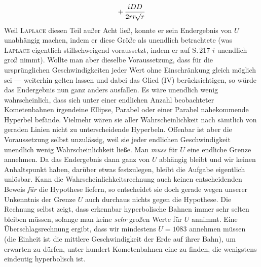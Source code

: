 \[+\,\frac{iDD}{2rr\mathord{{}^{}\!\surd}r}\]
Weil \textsc{Laplace} diesen Teil außer Acht ließ, konnte er sein Endergebnis von $U$ unabhängig machen, indem er diese Größe als unendlich betrachtete (was \textsc{Laplace} eigentlich stillschweigend voraussetzt, indem er auf S.\,217 $i$ unendlich groß nimmt). Wollte man aber dieselbe Voraussetzung, dass für die ursprünglichen Geschwindigkeiten jeder Wert ohne Einschränkung gleich möglich sei --- weiterhin gelten lassen und dabei das Glied (IV) berücksichtigen, so würde das Endergebnis nun ganz anders ausfallen. Es wäre unendlich wenig wahrscheinlich, dass sich unter einer endlichen Anzahl beobachteter Kometenbahnen irgendeine Ellipse, Parabel oder einer Parabel nahekommende Hyperbel befände. Vielmehr wären sie aller Wahrscheinlichkeit nach sämtlich von geraden Linien nicht zu unterscheidende Hyperbeln. Offenbar ist aber die Voraussetzung selbst unzulässig, weil sie jeder endlichen Geschwindigkeit unendlich wenig Wahrscheinlichkeit ließe. Man \emph{muss} für $U$ eine endliche Grenze annehmen. Da das Endergebnis dann ganz von $U$ abhängig bleibt und wir keinen Anhaltspunkt haben, darüber etwas festzulegen, bleibt die Aufgabe eigentlich unlösbar. Kann die Wahrscheinlichkeitsrechnung auch keinen entscheidenden Beweis \emph{für} die Hypothese liefern, so entscheidet sie doch gerade wegen unserer Unkenntnis der Grenze $U$ auch durchaus nichts gegen die Hypothese. Die Rechnung selbst zeigt, dass erkennbar hyperbolische Bahnen immer sehr selten bleiben müssen, solange man keine \emph{sehr} großen Werte für $U$ annimmt. Eine Überschlagsrechnung ergibt, dass wir mindestens $U = 1083$ annehmen müssen (die Einheit ist die mittlere Geschwindigkeit der Erde auf ihrer Bahn), um erwarten zu dürfen, unter hundert Kometenbahnen eine zu finden, die wenigstens eindeutig hyperbolisch ist.

